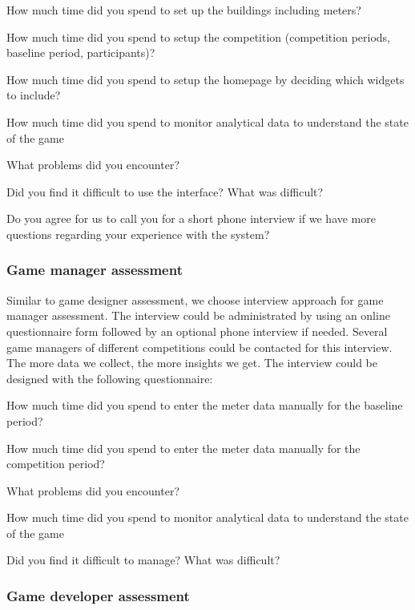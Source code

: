 \begin{compactitem}
\item How much time did you spend to set up the buildings including meters?
\item How much time did you spend to setup the competition (competition periods, baseline period, participants)?
\item How much time did you spend to setup the homepage by deciding which widgets to include?
\item How much time did you spend to monitor analytical data to understand the state of the game
\item What problems did you encounter?
\item Did you find it difficult to use the interface? What was difficult?
\item Do you agree for us to call you for a short phone interview if we have more questions regarding your experience with the system?
\end{compactitem}
    
\subsubsection{Game manager assessment}

Similar to game designer assessment, we choose interview approach for game manager assessment. The interview could be administrated by using an online questionnaire form followed by an optional phone interview if needed. Several game managers of different competitions could be contacted for this interview. The more data we collect, the more insights we get. The interview could be designed with the following questionnaire: 

\begin{compactitem}
\item How much time did you spend to enter the meter data manually for the baseline period?
\item How much time did you spend to enter the meter data manually for the competition period?    
\item What problems did you encounter?
\item How much time did you spend to monitor analytical data to understand the state of the game
\item Did you find it difficult to manage? What was difficult?\\
\end{compactitem}
    
\subsubsection{Game developer assessment}

